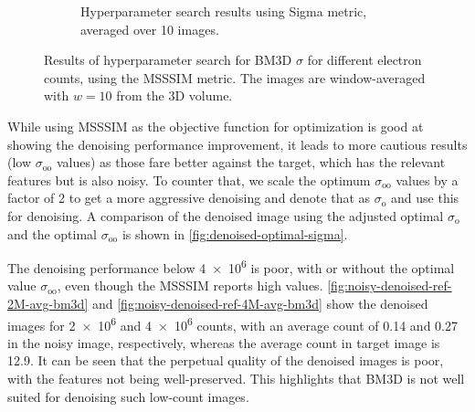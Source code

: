 \begin{figure}
\begin{subfigure}[t]{0.49\linewidth}
        \caption{Hyperparameter search results using Sigma metric, averaged over 10 images.}
        \label{fig:hyperparameter-sigma-averaged-10-images}
    \end{subfigure}
    \caption{Results of hyperparameter search for \gls{BM3D} $\sigma$ for different electron counts, using the \gls{MSSSIM} metric. The images are window-averaged with $w=10$ from the 3D volume.}
    \label{fig:hyperparameter-averaged-10-images}
\end{figure}

While using \gls{MSSSIM} as the objective function for optimization is good at showing the denoising performance improvement, it leads to more cautious results (low $\sigma_{\text{oo}}$ values) as those fare better against the target, which has the relevant features but is also noisy. To counter that, we scale the optimum $\sigma_{\text{oo}}$ values by a factor of 2 to get a more aggressive denoising and denote that as $\sigma_{\text{o}}$ and use this for denoising. A comparison of the denoised image using the adjusted optimal $\sigma_{\text{o}}$ and the optimal $\sigma_{\text{oo}}$ is shown in \cref{fig:denoised-optimal-sigma}.

The denoising performance below \num{4e6} is poor, with or without the optimal value $\sigma_{\text{oo}}$, even though the \gls{MSSSIM} reports high values. \cref{fig:noisy-denoised-ref-2M-avg-bm3d} and \cref{fig:noisy-denoised-ref-4M-avg-bm3d} show the denoised images for \num{2e6} and \num{4e6} counts, with an average count of \num{0.14} and \num{0.27} in the noisy image, respectively, whereas the average count in target image is \num{12.9}. It can be seen that the perpetual quality of the denoised images is poor, with the features not being well-preserved. This highlights that \gls{BM3D} is not well suited for denoising such low-count images.

